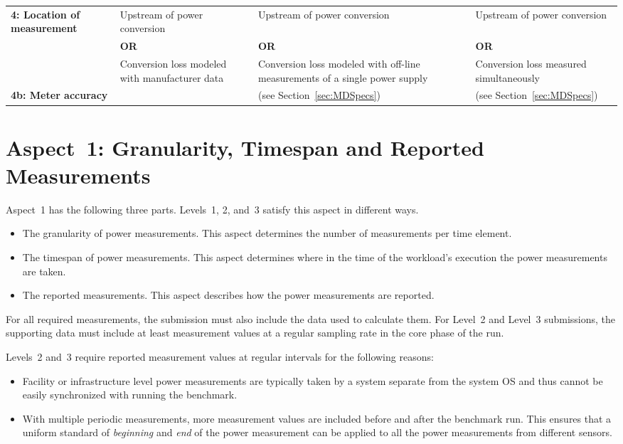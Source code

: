 \begin{table}
\begin{tabular}{|p{3.0cm}|p{3.5cm}|p{3.5cm}|p{3.5cm}|}
\textbf{4: Location of measurement} &
Upstream of power conversion &
Upstream of power conversion &
Upstream of power conversion\\

 &
\centering \textbf{OR} &
\centering \textbf{OR} &
\centering \textbf{OR} \tabularnewline

 &
Conversion loss modeled with manufacturer data &
Conversion loss modeled with off-line measurements of a single power supply &
Conversion loss measured simultaneously \\
\hline
\textbf{4b: Meter accuracy} &
\SpecAccuracyLOne{} &
\SpecAccuracyLTwo{} (see Section~\ref{sec:MDSpecs})&
\SpecAccuracyLThree{} (see Section~\ref{sec:MDSpecs})\\
\hline
\end{tabular}
\end{table}

\section{Aspect~1: Granularity, Timespan and Reported Measurements}
\label{sec:A1GTRM}
\noindent
Aspect~1 has the following three parts.
Levels~1, 2, and~3 satisfy this aspect in different ways.

\begin{itemize}
\item
The granularity of power measurements.
This aspect determines the number of measurements per time element.
\item
The timespan of power measurements.
This aspect determines where in the time of the workload's execution the power measurements are taken.
\item
The reported measurements.
This aspect describes how the power measurements are reported.
\end{itemize}

\noindent
For all required measurements, the submission must also include the data used to calculate them.
For Level~2 and Level~3 submissions, the supporting data must include at least \MinMeasurementsCorePhaseLTwoThree{} measurement values at a regular sampling rate in the core phase of the run.
\wl

\noindent
Levels~2 and~3 require reported measurement values at regular intervals for the following reasons:

\begin{itemize}
\item
Facility or infrastructure level power measurements are typically taken by a system separate from the system OS and thus cannot be easily synchronized with running the benchmark.
\item
With multiple periodic measurements, more measurement values are included before and after the benchmark run.
This ensures that a uniform standard of \textit{beginning} and \textit{end} of the power measurement can be applied to all the power measurements from different sensors.
\end{itemize}

